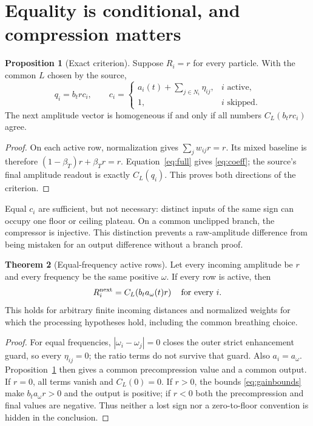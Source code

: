 \documentclass[11pt,a4paper]{article}
\theoremstyle{definition}
\newtheorem{theorem}{Theorem}[section]
\newtheorem{proposition}[theorem]{Proposition}
\theoremstyle{remark}\newtheorem{remark}[theorem]{Remark}
\numberwithin{equation}{section}
\begin{document}
\section{Equality is conditional, and compression matters}\label{sec:equality}
\begin{proposition}[Exact criterion]\label{prop:criterion}
Suppose $R_i=r$ for every particle. With the common $L$ chosen by the source,
\begin{equation}\label{eq:coeff}
 q_i=b_t r c_i,\qquad
 c_i=
 \begin{cases}
 a_i(t)+\sum_{j\in N_i}\eta_{ij},&i\text{ active},\\
 1,&i\text{ skipped}.
 \end{cases}
\end{equation}
The next amplitude vector is homogeneous if and only if all numbers
$C_L(b_t r c_i)$ agree.
\end{proposition}
\begin{proof}
On each active row, normalization gives $\sum_j w_{ij}r=r$.
Its mixed baseline is therefore $(1-\beta_T)r+\beta_T r=r$.
Equation~\eqref{eq:full} gives \eqref{eq:coeff}; the source's final amplitude
readout is exactly $C_L(q_i)$. This proves both directions of the criterion.
\end{proof}
Equal $c_i$ are sufficient, but not necessary: distinct inputs of the same sign
can occupy one floor or ceiling plateau. On a common unclipped branch, the compressor
is injective. This distinction prevents a raw-amplitude difference from being
mistaken for an output difference without a branch proof.

\begin{theorem}[Equal-frequency active rows]\label{thm:equal}
Let every incoming amplitude be $r$ and every frequency be the same positive $\omega$.
If every row is active, then
\begin{equation}\label{eq:equal}
 R_i^{\rm next}=C_L\!\left(b_t a_\omega(t)r\right)
 \quad\hbox{for every }i.
\end{equation}
This holds for arbitrary finite incoming distances and normalized weights for which
the processing hypotheses hold, including the common breathing choice.
\end{theorem}
\begin{proof}
For equal frequencies, $|\omega_i-\omega_j|=0$ closes the outer strict
enhancement guard, so every $\eta_{ij}=0$; the ratio terms do not survive that
guard. Also $a_i=a_\omega$. Proposition~\ref{prop:criterion} then gives a common
precompression value and a common output.
If $r=0$, all terms vanish and $C_L(0)=0$.
If $r>0$, the bounds \eqref{eq:gainbounds} make $b_ta_\omega r>0$ and the output
is positive; if $r<0$ both the precompression and final values are negative.
Thus neither a lost sign nor a zero-to-floor convention is hidden in the conclusion.
\end{proof}
\end{document}

